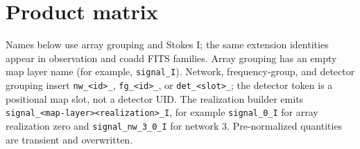 \documentclass[11pt]{article}
\newcommand{\code}[1]{\nolinkurl{#1}}
\begin{document}
\section{Product matrix}

Names below use array grouping and Stokes I; the same extension identities
appear in observation and coadd FITS families.  Array grouping has an empty map
layer name (for example, \code{signal_I}).  Network, frequency-group, and
detector grouping insert \code{nw_<id>_}, \code{fg_<id>_}, or
\code{det_<slot>_}; the detector token is a positional map slot, not a detector
UID.  The realization builder emits
\code{signal_<map-layer><realization>_I}, for example \code{signal_0_I} for
array realization zero and \code{signal_nw_3_0_I} for network 3.  Pre-normalized
quantities are transient and overwritten.
\end{document}
